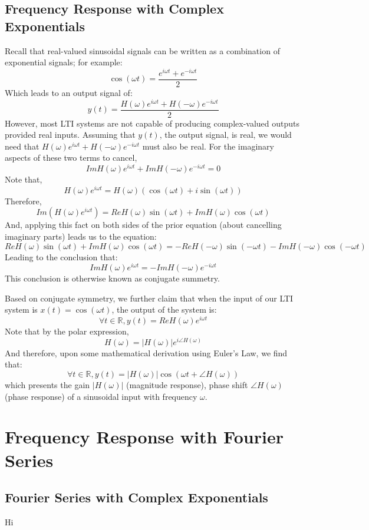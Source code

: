 \subsection{Frequency Response with Complex Exponentials}
Recall that real-valued sinusoidal signals can be written as a combination of exponential signals; for example:
\[
    \cos(\omega t) = \frac{e^{i \omega t} + e^{-i \omega t}}{2}
\]
Which leads to an output signal of:
\[
    y(t) = \frac{H(\omega) e^{i \omega t} + H(-\omega) e^{-i \omega t}}{2}
\]
However, most LTI systems are not capable of producing complex-valued outputs provided real inputs.
Assuming that $y(t)$, the output signal, is real, we would need that $H(\omega) e^{i \omega t} + H(-\omega) e^{-i \omega t}$ must also be real.
For the imaginary aspects of these two terms to cancel,
\[
    Im{H(\omega) e^{i \omega t}} + Im{H(-\omega) e^{-i \omega t}} = 0
\]
Note that,
\[
    H(\omega) e^{i \omega t} = H(\omega) (\cos(\omega t) + i \sin(\omega t))
\]
Therefore,
\[
    Im(H(\omega) e^{i \omega t}) = Re{H(\omega)} \sin(\omega t) + Im{H(\omega)} \cos(\omega t)
\]
And, applying this fact on both sides of the prior equation (about cancelling imaginary parts) leads us to the equation:
\[
    Re{H(\omega)} \sin(\omega t) + Im{H(\omega)} \cos(\omega t) = -Re{H(-\omega)} \sin(-\omega t) - Im{H(-\omega)} \cos(-\omega t)
\]
Leading to the conclusion that:
\[
    Im{H(\omega) e^{i \omega t}} = -Im{H(-\omega) e^{-i \omega t}}
\]
This conclusion is otherwise known as conjugate summetry.

Based on conjugate symmetry, we further claim that when the input of our LTI system is $x(t) = \cos(\omega t)$, the output of the system is:
\[
    \forall t \in \mathbb{R}, y(t) = Re{H(\omega) e^{i \omega t}}
\]
Note that by the polar expression,
\[
    H(\omega) = |H(\omega)| e^{i \angle H(\omega)}
\]
And therefore, upon some mathematical derivation using Euler's Law, we find that:
\[
    \forall t \in \mathbb{R}, y(t) = |H(\omega)| \cos(\omega t + \angle H(\omega))
\]
which presents the gain $|H(\omega)|$ (magnitude response), phase shift $\angle H(\omega)$ (phase response) of a sinusoidal input with frequency $\omega$.

\section{Frequency Response with Fourier Series}
\subsection{Fourier Series with Complex Exponentials}
Hi

